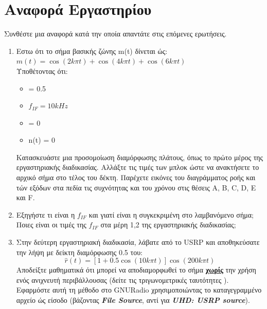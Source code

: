 \documentclass[12pt]{report}
\begin{document}
    \section{\textbf{\textsf{Αναφορά Εργαστηρίου}}}
        Συνθέστε μια αναφορά κατά την οποία απαντάτε στις επόμενες ερωτήσεις.
        \begin{enumerate}
            \item Εστω ότι το σήμα βασικής ζώνης m(t) δίνεται ώς: $m(t) = \cos(2k\pi t) + \cos(4k\pi t) + \cos(6k\pi t)$\\
                Υποθέτοντας ότι:
                \begin{itemize}
                    \item \mu = 0.5
                    \item $f_{IF} = 10kHz$
                    \item \theta = 0
                    \item n(t) = 0
                \end{itemize}
                Κατασκευάστε μια προσομοίωση διαμόρφωσης πλάτους, όπως το πρώτο μέρος της εργαστηριακής διαδικασίας.
                Αλλάξτε τις τιμές των μπλοκ ώστε να ανακτήσετε το αρχικό σήμα στο τέλος του δέκτη.
                Παρέχετε εικόνες του διαγράμματος ροής και τών εξόδων στα πεδία τις συχνότητας και του χρόνου στις
                θέσεις A, B, C, D, E και F.
            \item Εξηγήστε τι είναι η $f_{IF}$ και γιατί είναι η συγκεκριμένη στο λαμβανόμενο σήμα;
                Ποιες είναι οι τιμές της $f_{IF}$ στα μέρη 1,2 της εργαστηριακής διαδικασίας;
            \item Στην δεύτερη εργαστηριακή διαδικασία, λάβατε από το USRP και αποθηκεύσατε την λήψη
                με δείκτη διαμόρφωσης 0.5 του:
                \begin{equation}
                    \label{eq:2ndAMsig}
                    \hat{r}(t) = [1 + 0.5\cos(10k\pi t)]\cos(200k\pi t)
                \end{equation}
                Αποδείξτε μαθηματικά ότι μπορεί να αποδιαμορφωθεί το σήμα \textbf{\underline{χωρίς}}
                την χρήση ενός ανιχνευτή περιβάλλουσας (δείτε τις τριγωνομετρικές ταυτότητες \footnotemark[1]).
                Εφαρμόστε αυτή τη μέθοδο στο GNURadio χρησιμοποιώντας το καταγεγραμμένο αρχείο ώς είσοδο 
                (βάζοντας \textbf{\textit{File Source}}, αντί για \textbf{\textit{UHD: USRP source}}).
        \end{enumerate}
\end{document}
